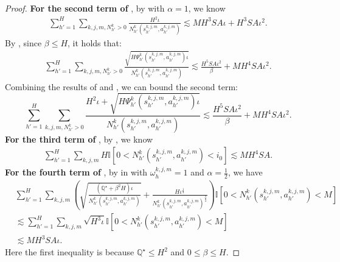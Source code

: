 \documentclass{article}
\begin{document}
\begin{proof}
\textbf{For the second term of }, by  with $\alpha = 1$, we know
\begin{align}
\label{z21}
    \sum_{h' = 1}^{H} \sum_{k,j,m,N_{h'}^k >0}\frac{H^2\iota}{N_{h'}^k(s_{h'}^{k,j,m},a_{h'}^{k,j,m})} \lesssim MH^3SA\iota + H^3SA\iota^2.
\end{align}
By , since $\beta \leq H$, it holds that:
\begin{align}
    \label{z22}
    \sum_{h'=1}^H\sum_{k,j,m,N_{h'}^k >0}\frac{\sqrt{H\Psi_{h'}^k(s_{h'}^{k,j,m}, a_{h'}^{k,j,m})\iota}}{N_{h'}^k(s_{h'}^{k,j,m}, a_{h'}^{k,j,m})} 
    \lesssim \frac{H^5SA\iota^2}{\beta}+M H^4SA\iota^2.
\end{align}
Combining the results of  and , we can bound the second term:
\begin{equation}
    \label{z2}
    \sum_{h'=1}^H\sum_{k,j,m,N_{h'}^k >0}\frac{H^2\iota+\sqrt{H\Psi_{h'}^k(s_{h'}^{k,j,m}, a_{h'}^{k,j,m})\iota}}{N_{h'}^k(s_{h'}^{k,j,m}, a_{h'}^{k,j,m})} \lesssim \frac{H^5SA\iota^2}{\beta}+M H^4SA\iota^2.
\end{equation}
\textbf{For the third term of }, by , we know
\begin{align}
\label{z3}
    \sum_{h' = 1}^{H}\sum_{k,j,m} H\mathbb{I}\left[0<N_{h'}^k(s_{{h'}}^{k,j,m},a_{{h'}}^{k,j,m}) <i_0 \right]  \lesssim MH^4SA.
\end{align}
\textbf{For the fourth term of }, by  in  with $\omega_h^{k,j,m}=1$ and $\alpha = \frac{1}{2}$, we have
\begin{align}
\label{z4}
    &\sum_{h' = 1}^{H}\sum_{k,j,m} \left(\sqrt{\frac{(\mathbb{Q^{\star}}+\beta^2H)\iota}{N_{h'}^k(s_{{h'}}^{k,j,m},a_{{h'}}^{k,j,m})}} +\frac{H\iota^{\frac{1}{4}}}{N_{h'}^k(s_{{h'}}^{k,j,m},a_{{h'}}^{k,j,m})^{\frac{3}{4}}}\right)\mathbb{I}\left[ 0<N_{h'}^k(s_{{h'}}^{k,j,m},a_{{h'}}^{k,j,m})< M\right]\nonumber\\
    &\lesssim \sum_{h' = 1}^{H}\sum_{k,j,m} \sqrt{H^3\iota} \mathbb{I}\left[ 0<N_{h'}^k(s_{{h'}}^{k,j,m},a_{{h'}}^{k,j,m})< M\right]   \nonumber\\
    &\lesssim MH^3SA\iota.
\end{align}
Here the first inequality is because $\mathbb{Q^{\star}} \leq H^2$ and $0\leq \beta \leq H$.


\end{proof}
\end{document}
